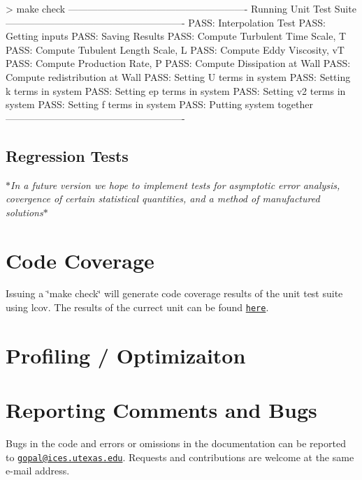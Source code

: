 \begin{DoxyPre} > make check
-------------------------------------------------------
Running Unit Test Suite
-------------------------------------------------------
PASS: Interpolation Test
PASS: Getting inputs
PASS: Saving Results
PASS: Compute Turbulent Time Scale, T
PASS: Compute Tubulent Length Scale, L
PASS: Compute Eddy Viscosity, vT
PASS: Compute Production Rate, P
PASS: Compute Dissipation at Wall
PASS: Compute redistribution at Wall
PASS: Setting U terms in system
PASS: Setting k terms in system
PASS: Setting ep terms in system
PASS: Setting v2 terms in system
PASS: Setting f terms in system
PASS: Putting system together 
-------------------------------------------------------
 \end{DoxyPre}
\hypertarget{index_regression}{}\subsection{Regression Tests}\label{index_regression}
{\itshape $\ast$In a future version we hope to implement tests for asymptotic error analysis, covergence of certain statistical quantities, and a method of manufactured solutions\/}$\ast$\hypertarget{index_coverage}{}\section{Code Coverage}\label{index_coverage}
Issuing a \char`\"{}make check\char`\"{} will generate code coverage results of the unit test suite using lcov. The results of the currect unit can be found \href{http://users.ices.utexas.edu/~gopal/v2f/lcov_html/}{\tt here}.\hypertarget{index_opt}{}\section{Profiling / Optimizaiton}\label{index_opt}
\hypertarget{index_bugs}{}\section{Reporting Comments and Bugs}\label{index_bugs}
Bugs in the code and errors or omissions in the documentation can be reported to \href{mailto:gopal@ices.utexas.edu}{\tt gopal@ices.utexas.edu}. Requests and contributions are welcome at the same e-\/mail address. 